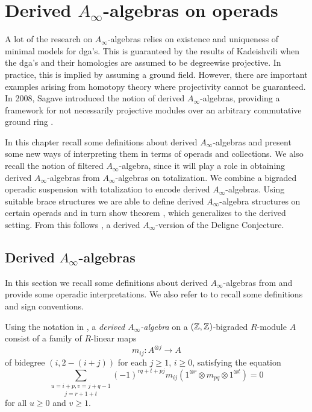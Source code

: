 \documentclass[Thesis.tex]{subfiles}
\begin{document}
\chapter{Derived $A_\infty$-algebras on operads}\label{deriveddef}
A lot of the research on $A_\infty$-algebras relies on existence and uniqueness of minimal models for dga's. This is guaranteed by the results of Kadeishvili \cite{kade} when the dga's and their homologies are assumed to be degreewise projective. In practice, this is implied by assuming a ground field. However, there are important examples arising from homotopy theory where projectivity cannot be guaranteed. In 2008, Sagave introduced the notion of derived $A_\infty$-algebras, providing a framework for not necessarily projective modules over an arbitrary commutative ground ring \cite{sagave}.

In this chapter recall some definitions about derived $A_\infty$-algebras and present some new ways of interpreting them in terms of operads and collections. We also recall the notion of filtered $A_\infty$-algebra, since it will play a role in obtaining derived $A_\infty$-algebras from $A_\infty$-algebras on totalization. We combine a bigraded operadic suspension with totalization to encode derived $A_\infty$-algebras. Using suitable brace structures we are able to define derived $A_\infty$-algebra structures on certain operads and in turn show theorem , which generalizes  to the derived setting. From this follows , a derived $A_\infty$-version of the Deligne Conjecture.


\section{Derived $A_\infty$-algebras}

In this section we recall some definitions about derived $A_\infty$-algebras from \cite{sagave} and provide some operadic interpretations. We also refer to  to recall some definitions and sign conventions.

  \begin{defin}
  Using the notation in \cite{RW}, a \emph{derived $A_\infty$-algebra} on a $(\mathbb{Z},\mathbb{Z})$-bigraded $R$-module $A$ consist of a family of $R$-linear maps 
\[m_{ij}:A^{\otimes j}\to A\]
of bidegree $(i,2-(i+j))$ for each $j\geq 1$, $i\geq 0$, satisfying the equation
\begin{equation}\label{dainftyequation}
\underset{j=r+1+t}{\sum_{u=i+p, v=j+q-1}}(-1)^{rq+t+pj}m_{ij}(1^{\otimes r}\otimes m_{pq}\otimes 1^{\otimes t})=0
\end{equation}
for all $u\geq 0$ and $v\geq 1$. 
\end{defin}
\end{document}
